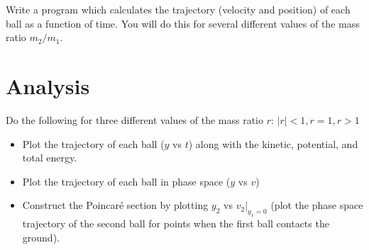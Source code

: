 \documentclass{article}
\begin{document}
Write a program which calculates the trajectory (velocity and position) of each ball as a function of time. You will do this for several different values of the mass ratio $m_2/m_1$.

\section*{Analysis}
Do the following for three different values of the mass ratio $r$: $|r|<1, r=1,r>1$
\begin{itemize}
	\item Plot the trajectory of each ball ($y$ vs $t$) along with the kinetic, potential, and total energy.
	\item Plot the trajectory of each ball in phase space ($y$ vs $v$)
	\item Construct the Poincar\'e section by plotting $y_2$ vs $v_2|_{y_1=0}$ (plot the phase space trajectory of the second ball for points when the first ball contacts the ground).
\end{itemize}
\end{document}
